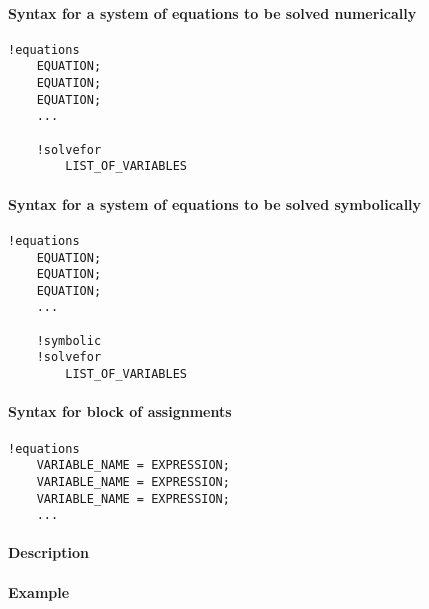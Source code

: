 


	\paragraph{Syntax for a system of equations to be solved
numerically}\label{syntax-for-a-system-of-equations-to-be-solved-numerically}

\begin{verbatim}
!equations
    EQUATION;
    EQUATION;
    EQUATION;
    ...

    !solvefor
        LIST_OF_VARIABLES
\end{verbatim}

\paragraph{Syntax for a system of equations to be solved
symbolically}\label{syntax-for-a-system-of-equations-to-be-solved-symbolically}

\begin{verbatim}
!equations
    EQUATION;
    EQUATION;
    EQUATION;
    ...

    !symbolic
    !solvefor
        LIST_OF_VARIABLES
\end{verbatim}

\paragraph{Syntax for block of
assignments}\label{syntax-for-block-of-assignments}

\begin{verbatim}
!equations
    VARIABLE_NAME = EXPRESSION;
    VARIABLE_NAME = EXPRESSION;
    VARIABLE_NAME = EXPRESSION;
    ...
\end{verbatim}

\paragraph{Description}\label{description}

\paragraph{Example}\label{example}



